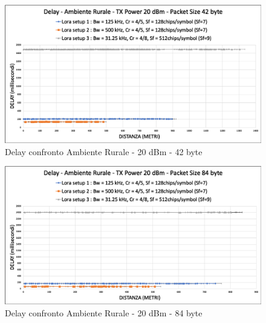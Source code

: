 \documentclass[12pt,a4paper,openright,twoside]{report}
\begin{document}
\begin{figure}[h]                      
\begin{center} 
\includegraphics[width=\textwidth]{DELAY_confronto_AR_20dBm_42byte.png}
\caption[Delay confronto Ambiente Rurale - 20 dBm - 42 byte]{Delay confronto Ambiente Rurale - 20 dBm - 42 byte}\label{fig:prima}
\end{center}
\end{figure}

\begin{figure}[h]                      
\begin{center} 
\includegraphics[width=\textwidth]{DELAY_confronto_AR_20dBm_84byte.png}
\caption[Delay confronto Ambiente Rurale - 20 dBm - 84 byte]{Delay confronto Ambiente Rurale - 20 dBm - 84 byte}\label{fig:prima}
\end{center}
\end{figure}
\end{document}
